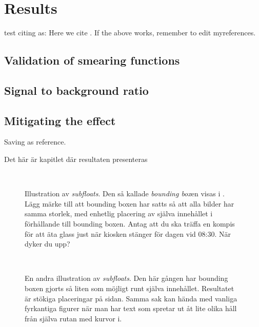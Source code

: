 \chapter{Results}\label{cha:res}
test citing as: Here we cite \citet{Duck:2005} \citep{Duck:2005}.
If the above works, remember to edit myreferences.
\section{Validation of smearing functions}
\section{Signal to background ratio}
\section{Mitigating the effect}

\newpage
Saving as reference.

Det här är kapitlet där resultaten presenteras

\begin{figure}[tbp]
  \centering
  \qquad
  \\
  \qquad
  \caption{\label{fig:times}%
    Illustration av \emph{subfloats}.  Den så kallade \emph{bounding box}en visas i \protect{}.  Lägg märke till att bounding boxen har satts så att alla bilder har samma storlek, med enhetlig placering av själva innehållet i förhållande till bounding boxen.  Antag att du ska träffa en kompis för att äta glass just när kiosken stänger för dagen vid 08:30.  När dyker du upp?}
\end{figure}

\begin{figure}[tbp]
  \centering
  \qquad
  \\
  \qquad
  \caption{\label{fig:times2}%
    En andra illustration av \emph{subfloats}.  Den här gången har bounding boxen gjorts så liten som möjligt runt själva innehållet.  Resultatet är stökiga placeringar på sidan.  Samma sak kan hända med vanliga fyrkantiga figurer när man har text som spretar ut åt lite olika håll från själva rutan med kurvor i.}
\end{figure}

